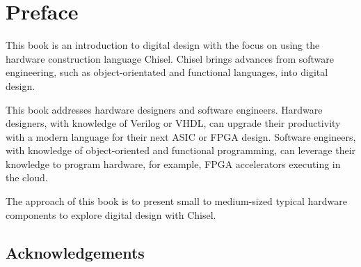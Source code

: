 \documentclass[%
    10pt,
    headinclude, footexclude,
    openright, %
    notitlepage,
    cleardoubleempty,
    headsepline,
    pointlessnumbers,
    bibtotoc, idxtotoc,
    ]{scrbook}
\begin{document}
\frontmatter

\hypertarget{contents}{}
\tableofcontents


\begingroup
\let\cleardoublepage\clearpage
\listoffigures
\listoftables
\lstlistoflistings
\endgroup

%
%
%

\chapter{Preface}

This book is an introduction to digital design with the focus on using the hardware construction language Chisel. Chisel brings advances from software engineering, such as object-orientated and functional languages, into digital design.

This book addresses hardware designers and software engineers. Hardware designers, with knowledge of Verilog or VHDL, can upgrade their productivity with a modern language for their next ASIC or FPGA design. Software engineers, with knowledge of object-oriented and functional programming, can leverage their knowledge to program hardware, for example, FPGA accelerators executing in the cloud.

The approach of this book is to present small to medium-sized typical hardware components to explore digital design with Chisel.





\section*{Acknowledgements}
\end{document}
